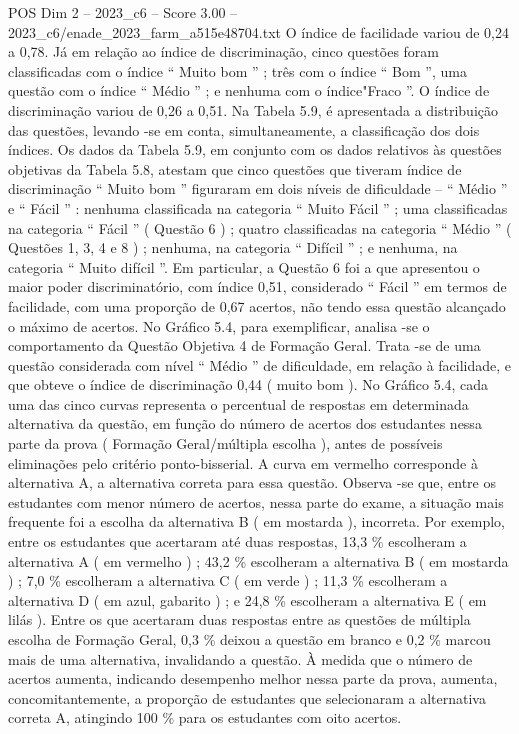 \begin{textsample}{POS Dim 2 – 2023\_c6 – Score 3.00 – 2023\_c6/enade\_2023\_farm\_a515e48704.txt}
O índice de facilidade variou de 0,24 a 0,78.
Já em relação ao índice de discriminação, cinco questões foram classificadas com o índice “ Muito bom ” ; três com o índice “ Bom ”, uma questão com o índice “ Médio ” ; e nenhuma com o índice"Fraco ”.
O índice de discriminação variou de 0,26 a 0,51.
Na Tabela 5.9, é apresentada a distribuição das questões, levando -se em conta, simultaneamente, a classificação dos dois índices.
Os dados da Tabela 5.9, em conjunto com os dados relativos às questões objetivas da Tabela 5.8, atestam que cinco questões que tiveram índice de discriminação “ Muito bom ” figuraram em dois níveis de dificuldade – “ Médio ” e “ Fácil ” : nenhuma classificada na categoria “ Muito Fácil ” ; uma classificadas na categoria “ Fácil ” ( Questão 6 ) ; quatro classificadas na categoria “ Médio ” ( Questões 1, 3, 4 e 8 ) ; nenhuma, na categoria “ Difícil ” ; e nenhuma, na categoria “ Muito difícil ”.
Em particular, a Questão 6 foi a que apresentou o maior poder discriminatório, com índice 0,51, considerado “ Fácil ” em termos de facilidade, com uma proporção de 0,67 acertos, não tendo essa questão alcançado o máximo de acertos.
No Gráfico 5.4, para exemplificar, analisa -se o comportamento da Questão Objetiva 4 de Formação Geral.
Trata -se de uma questão considerada com nível “ Médio ” de dificuldade, em relação à facilidade, e que obteve o índice de discriminação 0,44 ( muito bom ).
No Gráfico 5.4, cada uma das cinco curvas representa o percentual de respostas em determinada alternativa da questão, em função do número de acertos dos estudantes nessa parte da prova ( Formação Geral/múltipla escolha ), antes de possíveis eliminações pelo critério ponto-bisserial.
A curva em vermelho corresponde à alternativa A, a alternativa correta para essa questão.
Observa -se que, entre os estudantes com menor número de acertos, nessa parte do exame, a situação mais frequente foi a escolha da alternativa B ( em mostarda ), incorreta.
Por exemplo, entre os estudantes que acertaram até duas respostas, 13,3 \% escolheram a alternativa A ( em vermelho ) ; 43,2 \% escolheram a alternativa B ( em mostarda ) ; 7,0 \% escolheram a alternativa C ( em verde ) ; 11,3 \% escolheram a alternativa D ( em azul, gabarito ) ; e 24,8 \% escolheram a alternativa E ( em lilás ).
Entre os que acertaram duas respostas entre as questões de múltipla escolha de Formação Geral, 0,3 \% deixou a questão em branco e 0,2 \% marcou mais de uma alternativa, invalidando a questão.
À medida que o número de acertos aumenta, indicando desempenho melhor nessa parte da prova, aumenta, concomitantemente, a proporção de estudantes que selecionaram a alternativa correta A, atingindo 100 \% para os estudantes com oito acertos.

\end{textsample}
